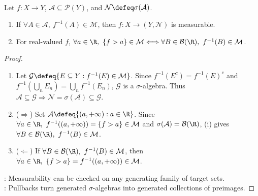 \begin{proposition} \label{prop:measurable-map-generator-test} \\
Let $f:X\to Y$, $\mathcal{A}\subseteq\mathcal{P}(Y)$, and $\mathcal{N}\defeq\sigma(\mathcal{A})$.
\begin{enumerate}[label=(\roman*)]
\setlength{\itemsep}{0pt}
\item If $\forall A\in\mathcal{A},\ f^{-1}(A)\in\mathcal{M}$, then $f:X\to(Y,\mathcal{N})$ is measurable.
\item For real-valued $f$, $\forall a\in\R,\ \{f>a\}\in\mathcal{M}\Longleftrightarrow \forall B\in\mathcal{B}(\R),\ f^{-1}(B)\in\mathcal{M}$.
\end{enumerate}
\begin{proof}
\begin{enumerate}[label=(\roman*)]
\setlength{\itemsep}{0pt}
\item Let $\mathcal{G}\defeq\{E\subseteq Y:f^{-1}(E)\in\mathcal{M}\}$. Since $f^{-1}(E^c)=f^{-1}(E)^c$ and $f^{-1}(\bigcup\limits_nE_n)=\bigcup\limits_nf^{-1}(E_n)$, $\mathcal{G}$ is a $\sigma$-algebra. Thus $\mathcal{A}\subseteq\mathcal{G}\Longrightarrow\mathcal{N}=\sigma(\mathcal{A})\subseteq\mathcal{G}$.
\item[$(ii)$] ($\Rightarrow$) Set $\mathcal{A}\defeq\{(a,+\infty):a\in\R\}$. Since $\forall a\in\R,\ f^{-1}((a,+\infty))=\{f>a\}\in\mathcal{M}$ and $\sigma(\mathcal{A})=\mathcal{B}(\R)$, (i) gives $\forall B\in\mathcal{B}(\R),\ f^{-1}(B)\in\mathcal{M}$.
\item[$(ii)$] ($\Leftarrow$) If $\forall B\in\mathcal{B}(\R),\ f^{-1}(B)\in\mathcal{M}$, then $\forall a\in\R,\ \{f>a\}=f^{-1}((a,+\infty))\in\mathcal{M}$.
\end{enumerate}
: Measurability can be checked on any generating family of target sets.\\
: Pullbacks turn generated $\sigma$-algebras into generated collections of preimages.
\end{proof}
\end{proposition}

